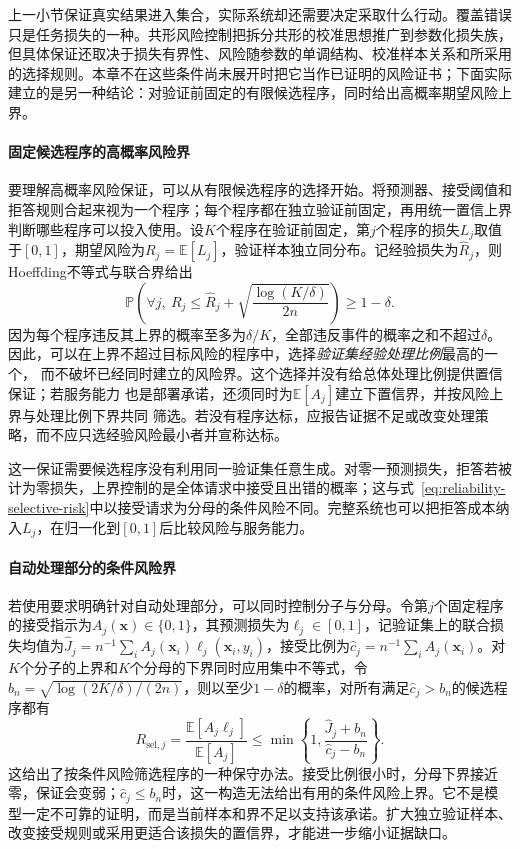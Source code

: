 上一小节保证真实结果进入集合，实际系统却还需要决定采取什么行动。覆盖错误只是任务损失的一种。共形风险控制把拆分共形的校准思想推广到参数化损失族，但具体保证还取决于损失有界性、风险随参数的单调结构、校准样本关系和所采用的选择规则。本章不在这些条件尚未展开时把它当作已证明的风险证书；下面实际建立的是另一种结论：对验证前固定的有限候选程序，同时给出高概率期望风险上界。

\paragraph{固定候选程序的高概率风险界}

要理解高概率风险保证，可以从有限候选程序的选择开始。将预测器、接受阈值和拒答规则合起来视为一个程序；每个程序都在独立验证前固定，再用统一置信上界判断哪些程序可以投入使用。设$K$个程序在验证前固定，第$j$个程序的损失$L_j$取值于$[0,1]$，期望风险为$R_j=\mathbb E[L_j]$，验证样本独立同分布。记经验损失为$\hat R_j$，则Hoeffding不等式与联合界给出
\begin{equation}
 \mathbb P\left(
  \forall j,\ R_j\leq
  \hat R_j+\sqrt{\frac{\log(K/\delta)}{2n}}
 \right)\geq1-\delta.
 \label{eq:reliability-finite-program-bound}
\end{equation}
因为每个程序违反其上界的概率至多为$\delta/K$，全部违反事件的概率之和不超过$\delta$。
因此，可以在上界不超过目标风险的程序中，选择\emph{验证集经验处理比例}最高的一个，
而不破坏已经同时建立的风险界。这个选择并没有给总体处理比例提供置信保证；若服务能力
也是部署承诺，还须同时为$\mathbb E[A_j]$建立下置信界，并按风险上界与处理比例下界共同
筛选。若没有程序达标，应报告证据不足或改变处理策略，而不应只选经验风险最小者并宣称达标。

这一保证需要候选程序没有利用同一验证集任意生成。对零一预测损失，拒答若被计为零损失，上界控制的是全体请求中接受且出错的概率；这与式~\eqref{eq:reliability-selective-risk}中以接受请求为分母的条件风险不同。完整系统也可以把拒答成本纳入$L_j$，在归一化到$[0,1]$后比较风险与服务能力。

\paragraph{自动处理部分的条件风险界}

若使用要求明确针对自动处理部分，可以同时控制分子与分母。令第$j$个固定程序的接受指示为$A_j(\bm{x})\in\{0,1\}$，其预测损失为$\ell_j\in[0,1]$，记验证集上的联合损失均值为$\hat J_j=n^{-1}\sum_i A_j(\bm{x}_i)\ell_j(\bm{x}_i,y_i)$，接受比例为$\hat c_j=n^{-1}\sum_i A_j(\bm{x}_i)$。对$K$个分子的上界和$K$个分母的下界同时应用集中不等式，令$b_n=\sqrt{\log(2K/\delta)/(2n)}$，则以至少$1-\delta$的概率，对所有满足$\hat c_j>b_n$的候选程序都有
\begin{equation}
 R_{\mathrm{sel},j}
 =\frac{\mathbb E[A_j\ell_j]}{\mathbb E[A_j]}
 \leq\min\left\{1,\frac{\hat J_j+b_n}{\hat c_j-b_n}\right\}.
 \label{eq:reliability-conditional-risk-bound}
\end{equation}
这给出了按条件风险筛选程序的一种保守办法。接受比例很小时，分母下界接近零，保证会变弱；$\hat c_j\leq b_n$时，这一构造无法给出有用的条件风险上界。它不是模型一定不可靠的证明，而是当前样本和界不足以支持该承诺。扩大独立验证样本、改变接受规则或采用更适合该损失的置信界，才能进一步缩小证据缺口。

